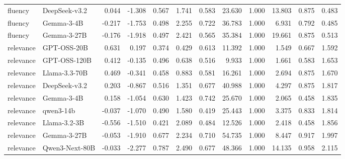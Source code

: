\begin{table}[t]
{\begin{tabular}{llrrrrrrrrrr}
fluency & DeepSeek-v3.2 & 0.044 & -1.308 & 0.567 & 1.741 & 0.583 & 23.630 & 1.000 & 13.803 & 0.875 & 0.483 \\
fluency & Gemma-3-4B & -0.217 & -1.753 & 0.498 & 2.255 & 0.722 & 36.783 & 1.000 & 6.931 & 0.792 & 0.485 \\
fluency & Gemma-3-27B & -0.176 & -1.918 & 0.497 & 2.421 & 0.565 & 35.384 & 1.000 & 19.661 & 0.875 & 0.513 \\
relevance & GPT-OSS-20B & 0.631 & 0.197 & 0.374 & 0.429 & 0.613 & 11.392 & 1.000 & 1.549 & 0.667 & 1.592 \\
relevance & GPT-OSS-120B & 0.412 & -0.135 & 0.496 & 0.638 & 0.516 & 9.933 & 1.000 & 1.661 & 0.583 & 1.653 \\
relevance & Llama-3.3-70B & 0.469 & -0.341 & 0.458 & 0.883 & 0.581 & 16.261 & 1.000 & 2.694 & 0.875 & 1.670 \\
relevance & DeepSeek-v3.2 & 0.203 & -0.867 & 0.516 & 1.351 & 0.677 & 40.988 & 1.000 & 4.297 & 0.875 & 1.817 \\
relevance & Gemma-3-4B & 0.158 & -1.054 & 0.630 & 1.423 & 0.742 & 25.670 & 1.000 & 2.065 & 0.458 & 1.835 \\
relevance & qwen3-14b & -0.037 & -1.070 & 0.490 & 1.580 & 0.419 & 25.443 & 1.000 & 3.375 & 0.833 & 1.814 \\
relevance & Llama-3.2-3B & -0.556 & -1.510 & 0.421 & 2.089 & 0.484 & 12.526 & 1.000 & 2.418 & 0.458 & 1.856 \\
relevance & Gemma-3-27B & -0.053 & -1.910 & 0.677 & 2.234 & 0.710 & 54.735 & 1.000 & 8.447 & 0.917 & 1.997 \\
relevance & Qwen3-Next-80B & -0.033 & -2.277 & 0.787 & 2.490 & 0.677 & 48.366 & 1.000 & 14.135 & 0.958 & 2.115 \\
\bottomrule
\end{tabular}
}
\end{table}
